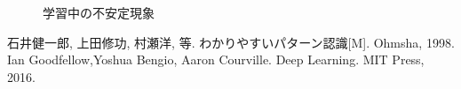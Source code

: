 \documentclass[ %
  uplatex,%
  papersize%
]{jsarticle}
\begin{document}
\begin{figure}[!h]
\centering
{}
\caption{学習中の不安定現象} 
\end{figure}



\begin{thebibliography}{9}
     石井健一郎, 上田修功, 村瀬洋, 等. わかりやすいパターン認識[M]. Ohmsha, 1998.
     Ian Goodfellow,Yoshua Bengio, Aaron Courville. Deep Learning. MIT Press, 2016.
\end{thebibliography}
\end{document}
